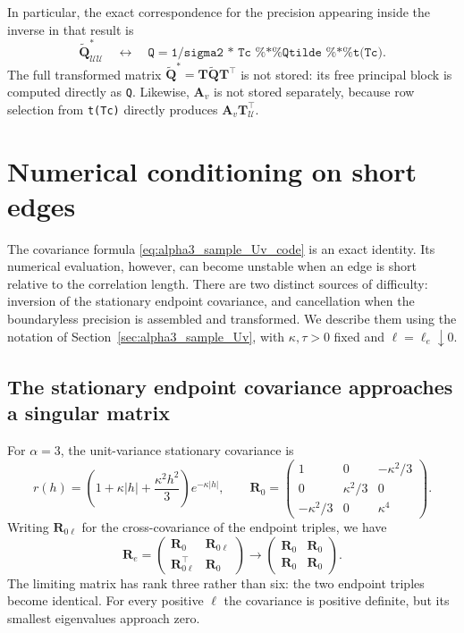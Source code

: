\documentclass[11pt,a4paper]{article}
\theoremstyle{plain}
\theoremstyle{definition}
\begin{document}
In particular, the exact correspondence for the precision appearing
inside the inverse in that result is
\begin{equation}
\boxed{\;
\widetilde{\mathbf Q}^{*}_{\mathcal U\mathcal U}
\quad\longleftrightarrow\quad \texttt{Q}
=\texttt{1/sigma\^{}2 * Tc \%*\% Qtilde \%*\% t(Tc)}.
\;}
\end{equation}
The full transformed matrix
$\widetilde{\mathbf Q}^{*}=\mathbf T\widetilde{\mathbf Q}\mathbf T^\top$
is not stored: its free principal block is computed directly as
\texttt{Q}. Likewise, $\mathbf A_v$ is not stored separately, because
row selection from \texttt{t(Tc)} directly produces
$\mathbf A_v\mathbf T_{\mathcal U}^\top$.

\section{Numerical conditioning on short edges}
\label{sec:short_edge_conditioning}

The covariance formula \eqref{eq:alpha3_sample_Uv_code} is an exact
identity. Its numerical evaluation, however, can become unstable when
an edge is short relative to the correlation length. There are two
distinct sources of difficulty: inversion of the stationary endpoint
covariance, and cancellation when the boundaryless precision is
assembled and transformed. We describe them using the notation of
Section~\ref{sec:alpha3_sample_Uv}, with $\kappa,\tau>0$ fixed and
$\ell=\ell_e\downarrow0$.

\subsection{The stationary endpoint covariance approaches a singular matrix}

For $\alpha=3$, the unit-variance stationary covariance is
\begin{equation}
r(h)=\left(1+\kappa|h|+\frac{\kappa^2h^2}{3}\right)e^{-\kappa|h|},
\qquad
\mathbf R_0=
\begin{pmatrix}
1&0&-\kappa^2/3\\
0&\kappa^2/3&0\\
-\kappa^2/3&0&\kappa^4
\end{pmatrix}.
\end{equation}
Writing $\mathbf R_{0\ell}$ for the cross-covariance of the endpoint
triples, we have
\begin{equation}
\mathbf R_e=
\begin{pmatrix}
\mathbf R_0&\mathbf R_{0\ell}\\
\mathbf R_{0\ell}^{\top}&\mathbf R_0
\end{pmatrix}
\longrightarrow
\begin{pmatrix}
\mathbf R_0&\mathbf R_0\\
\mathbf R_0&\mathbf R_0
\end{pmatrix}.
\label{eq:short_edge_covariance_limit}
\end{equation}
The limiting matrix has rank three rather than six: the two endpoint
triples become identical. For every positive $\ell$ the covariance is
positive definite, but its smallest eigenvalues approach zero.
\end{document}
